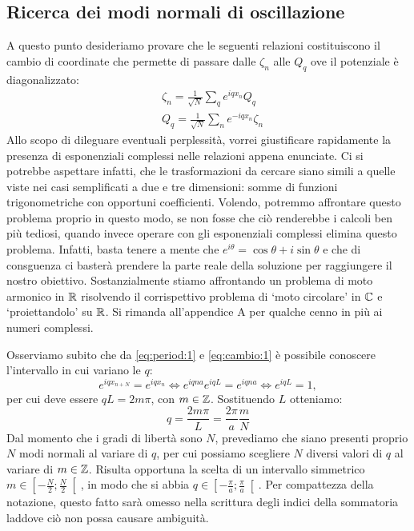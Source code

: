     \subsection{Ricerca dei modi normali di oscillazione}
        A questo punto desideriamo provare che le seguenti relazioni costituiscono il cambio di coordinate che permette di passare dalle $\zeta_n$ alle $Q_q$ ove il potenziale \`e diagonalizzato:
        \begin{align}
            &\zeta_n=\frac{1}{\sqrt{N}}\sum_q e^{iqx_n}Q_q \label{eq:cambio:1}\\
            &Q_q=\frac{1}{\sqrt{N}}\sum_n e^{-iqx_n}\zeta_n \label{eq:cambio:2}
        \end{align}
        Allo scopo di dileguare eventuali perplessit\`a, vorrei giustificare rapidamente la presenza di esponenziali complessi nelle relazioni appena enunciate. Ci si potrebbe aspettare infatti, che le trasformazioni da cercare siano simili a quelle viste nei casi semplificati a due e tre dimensioni: somme di funzioni trigonometriche con opportuni coefficienti. Volendo, potremmo affrontare questo problema proprio in questo modo, se non fosse che ci\`o renderebbe i calcoli ben pi\`u tediosi, quando invece operare con gli esponenziali complessi elimina questo problema. Infatti, basta tenere a mente che $e^{i\theta}=\cos\theta+i\sin\theta$ e che di consguenza ci baster\`a prendere la parte reale della soluzione per raggiungere il nostro obiettivo. Sostanzialmente stiamo affrontando un problema di moto armonico in $\mathbb{R}$ risolvendo il corrispettivo problema di `moto circolare' in $\mathbb{C}$ e `proiettandolo' su $\mathbb{R}$. Si rimanda all'appendice A per qualche cenno in pi\`u ai numeri complessi.
        \par Osserviamo subito che da \eqref{eq:period:1} e \eqref{eq:cambio:1} \`e possibile conoscere l'intervallo in cui variano le $q$: $$e^{iqx_{n+N}}=e^{iqx_n} \iff e^{iqna}e^{iqL}=e^{iqna} \iff e^{iqL}=1,$$ per cui deve essere $qL=2m\pi$, con $m\in\mathbb{Z}$. Sostituendo $L$ otteniamo:
        \begin{equation}
            q=\frac{2m\pi}{L}=\frac{2\pi}{a}\frac{m}{N}
            \label{eq:q}
        \end{equation}
        Dal momento che i gradi di libert\`a sono $N$, prevediamo che siano presenti proprio $N$ modi normali al variare di $q$, per cui possiamo scegliere $N$ diversi valori di $q$ al variare di $m\in\mathbb{Z}$. Risulta opportuna la scelta di un intervallo simmetrico $\displaystyle m\in\left[-\frac{N}{2};\frac{N}{2}\right[$, in modo che si abbia $\displaystyle q\in\left[-\frac{\pi}{a};\frac{\pi}{a}\right[$. Per compattezza della notazione, questo fatto sar\`a omesso nella scrittura degli indici della sommatoria laddove ci\`o non possa causare ambiguit\`a. 
